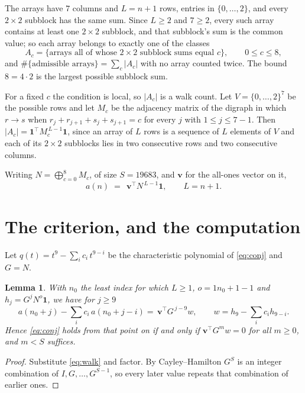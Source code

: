 \documentclass[11pt,a4paper]{article}
\theoremstyle{plain}
\newtheorem{lemma}[theorem]{Lemma}
\theoremstyle{definition}
\begin{document}
The arrays have $7$ columns and $L=n+1$ rows, entries in
$\{0,\dots,2\}$, and every $2\times2$ subblock has the same sum. Since $L\ge2$ and
$7\ge2$, every such array contains at least one $2\times2$ subblock, and that subblock's
sum is the common value; so each array belongs to exactly one of the classes
\[
A_c=\{\text{arrays all of whose }2\times2\text{ subblock sums equal }c\},
\qquad 0\le c\le 8,
\]
and $\#\{\text{admissible arrays}\}=\sum_c |A_c|$ with no array counted twice. The bound
$8=4\cdot2$ is the largest possible subblock sum.

For a fixed $c$ the condition is local, so $|A_c|$ is a walk count. Let
$V=\{0,\dots,2\}^{7}$ be the possible rows and let $M_c$ be the adjacency
matrix of the digraph in which $r\to s$ when
$r_j+r_{j+1}+s_j+s_{j+1}=c$ for every $j$ with $1\le j\le 7-1$. Then
$|A_c|=\mathbf{1}^{\!\top}M_c^{\,L-1}\mathbf{1}$, since an array of $L$ rows is a
sequence of $L$ elements of $V$ and each of its $2\times2$ subblocks lies in two consecutive
rows and two consecutive columns.

Writing $N=\bigoplus_{c=0}^{8}M_c$, of size $S=19683$, and $\mathbf{v}$ for the
all-ones vector on it,
\begin{equation}\label{eq:walk}
a(n)\;=\;\,\mathbf{v}^{\!\top}N^{\,L-1}\mathbf{1},\qquad L=n+1.
\end{equation}

\section{The criterion, and the computation}

Let $q(t)=t^{9}-\sum_i c_i\,t^{9-i}$ be the characteristic polynomial of
\eqref{eq:conj} and $G=N$.

\begin{lemma}\label{lem:crit}
With $n_0$ the least index for which $L\ge1$, $o=1n_0+1-1$ and
$h_j=G^{j}N^{o}\mathbf{1}$, we have for $j\ge9$
\[
a(n_0+j)-\sum_i c_i\,a(n_0+j-i)=\,\mathbf{v}^{\!\top}G^{\,j-9}w,
\qquad w=h_{9}-\sum_i c_ih_{9-i} .
\]
Hence \eqref{eq:conj} holds from that point on if and only if
$\mathbf{v}^{\!\top}G^{m}w=0$ for all $m\ge0$, and $m<S$ suffices.
\end{lemma}

\begin{proof}
Substitute \eqref{eq:walk} and factor. By Cayley--Hamilton $G^{S}$ is an integer
combination of $I,G,\dots,G^{S-1}$, so every later value repeats that combination of
earlier ones.
\end{proof}
\end{document}
